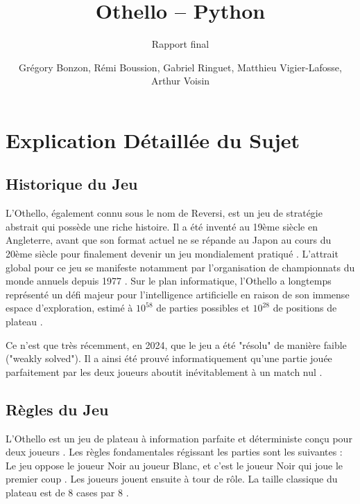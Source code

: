 \documentclass[a4paper]{article}
\title{Othello -- Python}
\subtitle{Rapport final}
\author{Grégory Bonzon, Rémi Boussion, Gabriel Ringuet, Matthieu Vigier-Lafosse, Arthur Voisin}
\begin{document}

\maketitle
\thispagestyle{empty}


\section{Explication Détaillée du Sujet}
\subsection{Historique du Jeu}

L'Othello, également connu sous le nom de Reversi, est un jeu de stratégie abstrait
qui possède une riche histoire. Il a été inventé au 19ème siècle en Angleterre,
avant que son format actuel ne se répande au Japon au cours du 20ème siècle pour
finalement devenir un jeu mondialement pratiqué \cite{WOF}. L'attrait global pour ce jeu
se manifeste notamment par l'organisation de championnats du monde annuels depuis 1977 \cite{WOF}.
Sur le plan informatique, l'Othello a longtemps représenté un défi majeur pour l'intelligence
artificielle \cite{Rosenbloom1982,Lee1990,Buro1997} en raison de son immense espace d'exploration, estimé à $10^{58}$ de parties
possibles et $10^{28}$ de positions de plateau \cite{Takizawa2024}.

Ce n'est que très récemment, en 2024, que le jeu a été "résolu" de manière faible
("weakly solved")\cite{Takizawa2024}. Il a ainsi été prouvé informatiquement qu'une partie jouée parfaitement
par les deux joueurs aboutit inévitablement à un match nul \cite{Takizawa2024}.

\subsection{Règles du Jeu}

L'Othello est un jeu de plateau à information parfaite et déterministe conçu pour deux joueurs \cite{OthelloSpecs2025}.
Les règles fondamentales régissant les parties sont les suivantes :
Le jeu oppose le joueur Noir au joueur Blanc, et c'est le joueur Noir qui joue le premier coup \cite{WOF}.
Les joueurs jouent ensuite à tour de rôle. La taille classique du plateau est de 8 cases par 8 \cite{OthelloSpecs2025}.
\end{document}
